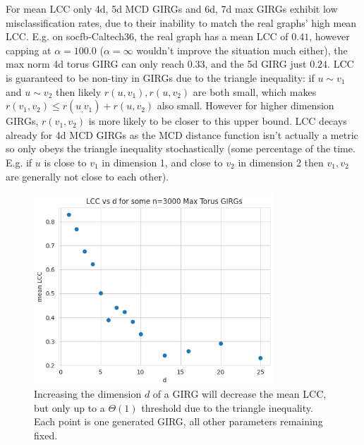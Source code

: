 For mean LCC only 4d, 5d MCD GIRGs and 6d, 7d max GIRGs exhibit low misclassification rates, due to their inability to match the real graphs' high mean LCC. E.g. on socfb-Caltech36, the real graph has a mean LCC of $0.41$, however capping at $\alpha=100.0$ ($\alpha=\infty$ wouldn't improve the situation much either), the max norm 4d torus GIRG can only reach $0.33$, and the 5d GIRG just $0.24$. LCC is guaranteed to be non-tiny in GIRGs due to the triangle inequality: if $u \sim v_1$ and $u \sim v_2$ then likely $r(u, v_1), r(u, v_2)$ are both small, which makes $r(v_1, v_2) \leq r(u_, v_1) + r(u, v_2)$ also small. However for higher dimension GIRGs, $r(v_1, v_2)$ is more likely to be closer to this upper bound. LCC decays already for 4d MCD GIRGs as the MCD distance function isn't actually a metric so only obeys the triangle inequality stochastically (some percentage of the time. E.g. if $u$ is close to $v_1$ in dimension 1, and close to $v_2$ in dimension 2 then $v_1, v_2$ are generally not close to each other).


\begin{figure}
    \centering
    \includegraphics[width=0.8\textwidth]{./figures/LCC_vs_d.png}
    \caption{Increasing the dimension $d$ of a GIRG will decrease the mean LCC, but only up to a $\Theta(1)$ threshold due to the triangle inequality. Each point is one generated GIRG, all other parameters remaining fixed.}
    \label{fig:LCC_vs_d}
\end{figure}




